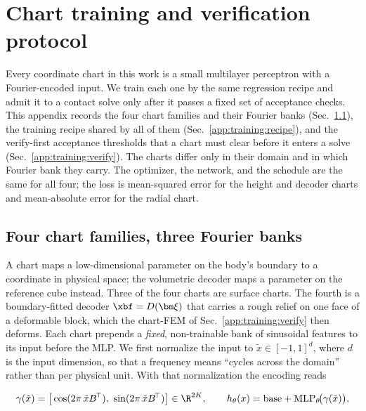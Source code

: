 \section{Chart training and verification protocol}\label{app:training}

Every coordinate chart in this work is a small multilayer perceptron with a Fourier-encoded input. We train each one by the same regression recipe and admit it to a contact solve only after it passes a fixed set of acceptance checks. This appendix records the four chart families and their Fourier banks (Sec.~\ref{app:training:families}), the training recipe shared by all of them (Sec.~\ref{app:training:recipe}), and the verify-first acceptance thresholds that a chart must clear before it enters a solve (Sec.~\ref{app:training:verify}). The charts differ only in their domain and in which Fourier bank they carry. The optimizer, the network, and the schedule are the same for all four; the loss is mean-squared error for the height and decoder charts and mean-absolute error for the radial chart.

\subsection{Four chart families, three Fourier banks}\label{app:training:families}

A chart maps a low-dimensional parameter on the body's boundary to a coordinate in physical space; the volumetric decoder maps a parameter on the reference cube instead. Three of the four charts are surface charts. The fourth is a boundary-fitted decoder $\xbf=D(\bm\xi)$ that carries a rough relief on one face of a deformable block, which the chart-FEM of Sec.~\ref{app:training:verify} then deforms. Each chart prepends a \emph{fixed}, non-trainable bank of sinusoidal features to its input before the MLP. We first normalize the input to $\tilde x\in[-1,1]^d$, where $d$ is the input dimension, so that a frequency means ``cycles across the domain'' rather than per physical unit. With that normalization the encoding reads

\begin{equation}\label{eq:appB-fourier}
\gamma(\tilde x)=\big[\cos(2\pi\,\tilde x B^{\!\top}),\ \sin(2\pi\,\tilde x B^{\!\top})\big]\in\R^{2K},
\qquad
h_\theta(x)=\mathrm{base}+\mathrm{MLP}_\theta\!\big(\gamma(\tilde x)\big),
\end{equation}

